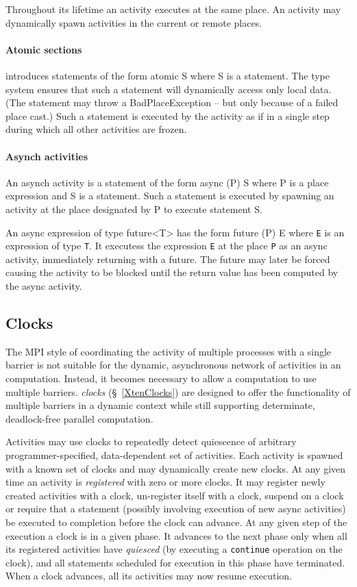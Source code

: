 Throughout its lifetime an activity executes at the same place. An
activity may dynamically spawn activities in the current or remote
places.

\paragraph{Atomic sections}

\Xten{} introduces statements of the form {\cf atomic S} where {\cf S}
is a statement.  The type system ensures that such a statement will
dynamically access only local data. (The statement may throw
a {\cf BadPlaceException} -- but only because of a failed place cast.)
Such a statement is executed by the activity as if in a single step
during which all other activities are frozen.

\paragraph{Asynch activities}

An asynch activity is a statement of the form {\cf async (P) S} where
{\cf P} is a place expression and {\cf S} is a statement.  Such a
statement is executed by spawning an activity at the place designated
by {\cf P} to execute statement {\cf S}.

An async expression of type {\cf future<T>} has the form {\cf future
(P) E} where {\tt E} is an expression of type {\tt T}. It executess
the expression {\tt E} at the place {\tt P} as an async activity,
immediately returning with a future. The future may later be forced
causing the activity to be blocked until the return value has been
computed by the async activity.

\subsection{Clocks}
The MPI style of coordinating the activity of multiple processes with
a single barrier is not suitable for the dynamic, asynchronous network
of activities in an \Xten{} computation. Instead, it becomes necessary
to allow a computation to use multiple barriers. \Xten{} {\em clocks}
(\S~\ref{XtenClocks}) are designed to offer the functionality of
multiple barriers in a dynamic context while still supporting
determinate, deadlock-free parallel computation.

Activities may use clocks to repeatedly detect quiescence of arbitrary
programmer-specified, data-dependent set of activities. Each activity
is spawned with a known set of clocks and may dynamically create new
clocks. At any given time an activity is {\em registered} with zero or
more clocks. It may register newly created activities with a clock,
un-register itself with a clock, suspend on a clock or require that a
statement (possibly involving execution of new async activities) be
executed to completion before the clock can advance.  At any given
step of the execution a clock is in a given phase. It advances to the
next phase only when all its registered activities have {\em quiesced}
(by executing a {\tt continue} operation on the clock), and all
statements scheduled for execution in this phase have terminated.
When a clock advances, all its activities may now resume execution.

